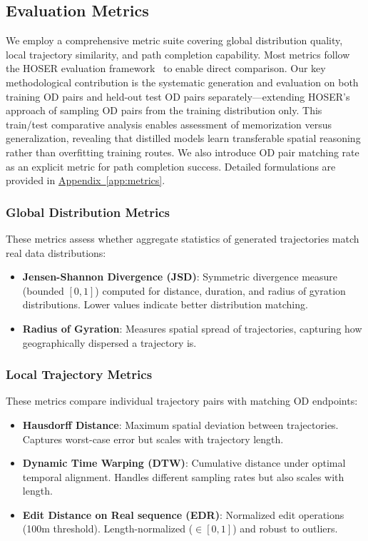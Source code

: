 \subsection{Evaluation Metrics}
\label{sec:eval-metrics}

We employ a comprehensive metric suite covering global distribution quality, local trajectory similarity, and path completion capability. Most metrics follow the HOSER evaluation framework~\cite{caoHolisticSemanticRepresentation2025,HOSEREvaluationMainipynb} to enable direct comparison. Our key methodological contribution is the systematic generation and evaluation on both training OD pairs and held-out test OD pairs separately---extending HOSER's approach of sampling OD pairs from the training distribution only. This train/test comparative analysis enables assessment of memorization versus generalization, revealing that distilled models learn transferable spatial reasoning rather than overfitting training routes. We also introduce OD pair matching rate as an explicit metric for path completion success. Detailed formulations are provided in \hyperref[app:metrics]{Appendix~\ref*{app:metrics}}.

\subsubsection{Global Distribution Metrics}

These metrics assess whether aggregate statistics of generated trajectories match real data distributions:

\begin{itemize}[noitemsep,topsep=0pt]
\item \textbf{Jensen-Shannon Divergence (JSD)}: Symmetric divergence measure (bounded $[0, 1]$) computed for distance, duration, and radius of gyration distributions. Lower values indicate better distribution matching.
\item \textbf{Radius of Gyration}: Measures spatial spread of trajectories, capturing how geographically dispersed a trajectory is.
\end{itemize}

\subsubsection{Local Trajectory Metrics}

These metrics compare individual trajectory pairs with matching OD endpoints:

\begin{itemize}[noitemsep,topsep=0pt]
\item \textbf{Hausdorff Distance}: Maximum spatial deviation between trajectories. Captures worst-case error but scales with trajectory length.
\item \textbf{Dynamic Time Warping (DTW)}: Cumulative distance under optimal temporal alignment. Handles different sampling rates but also scales with length.
\item \textbf{Edit Distance on Real sequence (EDR)}: Normalized edit operations (100m threshold). Length-normalized ($\in [0,1]$) and robust to outliers.
\end{itemize}


